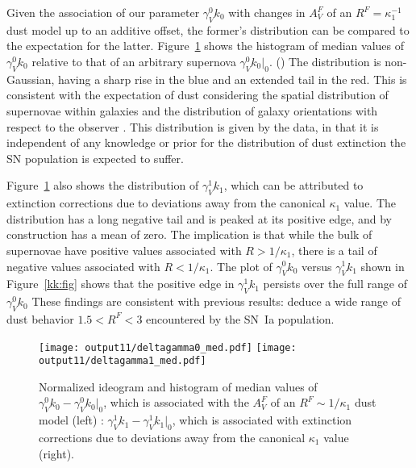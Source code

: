 \documentclass{aastex61}   	%
\begin{document}
Given the association of  our parameter $\gamma^0_V k_0$ with changes in $A^F_V$ of an $R^F =\kappa^{-1}_1$ dust model up to an additive offset,
the former's distribution can be compared to the expectation for the latter.
Figure~\ref{k0_med:fig} shows the histogram of
median values of $\gamma^0_V k_0$ 
\color{purple}
relative to that of an arbitrary supernova  $\gamma^0_V k_0|_0$.
()
\color{black}
The distribution is non-Gaussian, having a sharp rise in the blue and an extended tail in the red.  This is consistent
with the expectation of dust considering the spatial distribution of supernovae within galaxies and the distribution of galaxy orientations with respect to the observer \citep{1998ApJ...502..177H}.  This distribution is given by the data, in that it is independent of any knowledge or prior
for the distribution of dust extinction the SN population is expected to suffer. 

Figure~\ref{k0_med:fig} also shows the distribution of $\gamma^1_V k_1$, which can be attributed to 
extinction corrections due to deviations away from the canonical $\kappa_1$ value.   The distribution has a long
negative tail and is peaked at its positive edge, and by construction has a mean of zero.
The implication is that while the bulk of supernovae have positive values associated with $R>1/\kappa_1$, there is a tail
of negative values associated with $R<1/\kappa_1$.  The plot of   $\gamma^0_V k_0$ versus $\gamma^1_V k_1$  shown in Figure~\ref{kk:fig} shows that
the positive edge in $\gamma^1_V k_1$ persists over the full range of  $\gamma^0_V k_0$
These findings are consistent with previous results:
\citet{2014ApJ...789...32B, 2015MNRAS.453.3300A} deduce a wide range of dust behavior $1.5<R^F<3$ encountered by the SN~Ia population.

\begin{figure}[htbp] %
   \centering
   \texttt{[image: output11/deltagamma0\_med.pdf]}
   \texttt{[image: output11/deltagamma1\_med.pdf]}
      \caption{
      \color{purple} Normalized ideogram and histogram 
      of
median values of $\gamma^0_V k_0-\gamma^0_V k_0|_0$, which is associated with the $A^F_V$ of an $R^F \sim 1/\kappa_1$ dust model
(left) : $\gamma^1_V k_1-\gamma^1_V k_1|_0$,
which  is associated with extinction corrections due to deviations away from the canonical $\kappa_1$ value (right).
      \color{black}
   \label{k0_med:fig}}
\end{figure}
\end{document}
